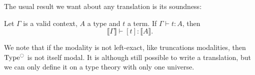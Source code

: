 The usual result we want about any translation is its soundness:
\begin{prop}
  Let $\Gamma$ is a valid context, $A$ a type and $t$ a term.
  If $\Gamma \vdash t : A$, then 
  \[\Lbrack \Gamma \Rbrack \vdash [t] : \Lbrack A \Rbrack. \]
\end{prop}

\begin{rmq}
  We note that if the modality is not left-exact, like truncations
  modalities, then $\operatorname{Type}^{\ocircle}$ is not itself modal. It is although
  still possible to write a translation, but we can only define it on
  a type theory with only one universe.
\end{rmq}

